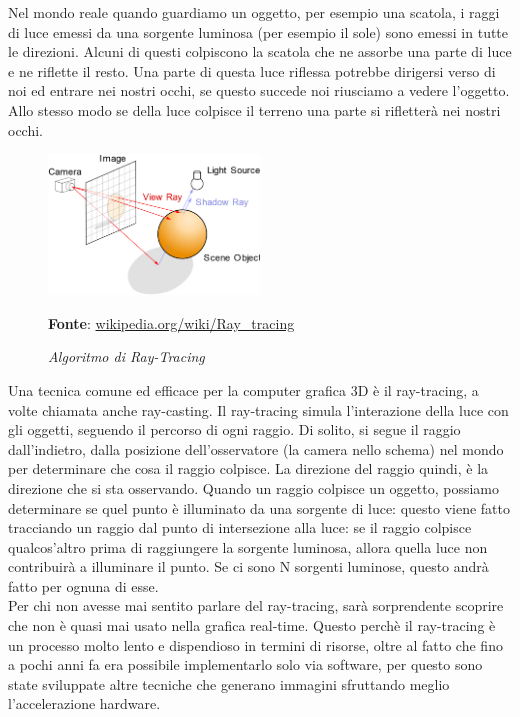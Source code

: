 Nel mondo reale quando guardiamo un oggetto, per esempio una scatola, i raggi di luce emessi da una sorgente luminosa (per esempio il sole) sono emessi in tutte le direzioni. Alcuni di questi colpiscono la scatola che ne assorbe una parte di luce e ne riflette il resto. Una parte di questa luce riflessa potrebbe dirigersi verso di noi ed entrare nei nostri occhi, se questo succede noi riusciamo a vedere l'oggetto. Allo stesso modo se della luce colpisce il terreno una parte si rifletterà nei nostri occhi.

\begin{figure}[h]
    \centering
    \includegraphics[width=0.5\textwidth]{immagini/volumerendering/ray_tracing_diagram.png}
    \caption{\textit{Algoritmo di Ray-Tracing}}
    \textbf{Fonte}: \href{https://en.wikipedia.org/wiki/Ray_tracing_(graphics)}{wikipedia.org/wiki/Ray\_tracing}
    \label{fig: Algoritmo di Ray-Tracing}
\end{figure}

Una tecnica comune ed efficace per la computer grafica 3D è il ray-tracing, a volte chiamata anche ray-casting. Il ray-tracing simula l'interazione della luce con gli oggetti, seguendo il percorso di ogni raggio. Di solito, si segue il raggio dall'indietro, dalla posizione dell'osservatore (la camera nello schema) nel mondo per determinare che cosa il raggio colpisce. La direzione del raggio quindi, è la direzione che si sta osservando. Quando un raggio colpisce un oggetto, possiamo determinare se quel punto è illuminato da una sorgente di luce: questo viene fatto tracciando un raggio dal punto di intersezione alla luce: se il raggio colpisce qualcos'altro prima di raggiungere la sorgente luminosa, allora quella luce non contribuirà a illuminare il punto. Se ci sono N sorgenti luminose, questo andrà fatto per ognuna di esse.
\\
Per chi non avesse mai sentito parlare del ray-tracing, sarà sorprendente scoprire che non è quasi mai usato nella grafica real-time. Questo perchè il ray-tracing è un processo molto lento e dispendioso in termini di risorse, oltre al fatto che fino a pochi anni fa era possibile implementarlo solo via software, per questo sono state sviluppate altre tecniche che generano immagini sfruttando meglio l'accelerazione hardware.

